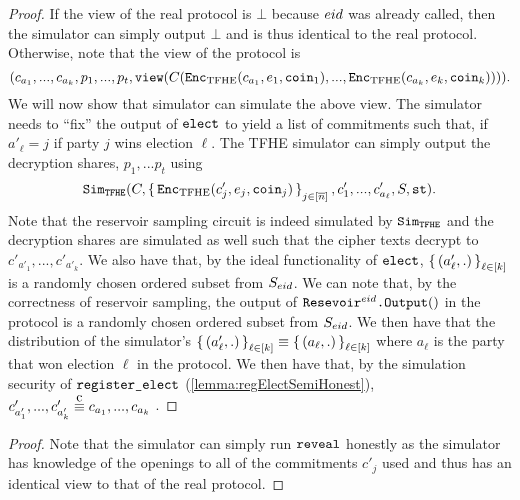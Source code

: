 \begin{lemma}
	\begin{proof}
		If the view of the real protocol is $\bot$ because ${eid}$ was already called, then the simulator can simply output $\bot$
		and is thus identical to the real protocol.
		Otherwise, note that the view of the protocol is
		$$
			(c_{a_1}, ..., c_{a_k}, p_1, ..., p_t, \texttt{view}(C(\texttt{Enc}_{\mathrm{TFHE}}(c_{a_1}, e_1, \texttt{coin}_1), ..., \texttt{Enc}_{\mathrm{TFHE}}(c_{a_k}, e_k, \texttt{coin}_k) ))).
		$$
		We will now show that simulator can simulate the above view.	
		The simulator needs to ``fix'' the output of $\texttt{elect}$ to yield
		a list of commitments such that, if $a'_\ell = j$ if party $j$ wins election $\ell$.
		The TFHE simulator can simply output the decryption shares, $p_1, ... p_t$ using 
		$$\texttt{Sim}_{{\texttt{TFHE}}}(C, \set{\texttt{Enc}_{\mathrm{TFHE}}(c'_j, e_j, \texttt{coin}_j)}_{j \in [\overline{n}]}, c'_1, ..., c'_{a_\ell}, S, \texttt{st}).$$
		Note that the reservoir sampling circuit is indeed simulated by $\texttt{Sim}_{{\texttt{TFHE}}}$
		and the decryption shares are simulated as well such that the cipher texts decrypt
		to $c'_{a'_1}, ..., c'_{a'_k}$.
		We also have that, by the ideal functionality of $\texttt{elect}$, $\set{(a'_\ell, .)}_{\ell \in [k]}$ is a randomly chosen
		ordered subset from $S_{eid}$. We can note that, by the correctness of reservoir sampling,
		the output of $\texttt{Resevoir}^{{eid}}\texttt{.Output}()$ in the protocol is a randomly chosen ordered subset from $S_{eid}$.
		We then have that the distribution of the simulator's $\set{(a'_\ell, .)}_{\ell \in [k]} \equiv \set{(a_\ell, .)}_{\ell \in [k]}$
		where $a_\ell$ is the party that won election $\ell$ in the protocol.
		We then have that, by the simulation security of $\texttt{register\_elect}$ (\cref{lemma:regElectSemiHonest}), $c'_{a'_1}, ..., c'_{a'_k} \compInd c_{a_1}, ..., c_{a_k}$ .
	\end{proof}
\end{lemma}

\begin{lemma}
	\begin{proof}
		Note that the simulator can simply run $\texttt{reveal}$ honestly as the simulator has knowledge of the openings to all of the commitments $c'_j$ used
		and thus has an identical view to that of the real protocol.
	\end{proof}
\end{lemma}



